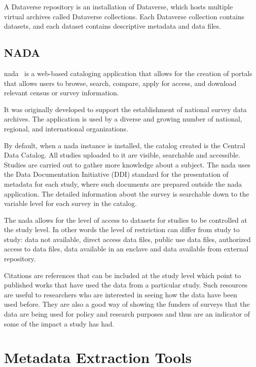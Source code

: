 A Dataverse repository is an installation of Dataverse, which hosts multiple virtual archives called Dataverse collections.
Each Dataverse collection contains datasets, and each dataset contains descriptive metadata and data files.


\subsection*{NADA}
\gls{nada}~\cite{nada} is a web-based cataloging application that allows for the creation of portals that allows users to browse, search, compare, apply for access, and download relevant census or survey information.

It was originally developed to support the establishment of national survey data archives.
The application is used by a diverse and growing number of national, regional, and international organizations.

By default, when a \gls{nada} instance is installed, the catalog created is the Central Data Catalog.
All studies uploaded to it are visible, searchable and accessible.
Studies are carried out to gather more knowledge about a subject.
The \gls{nada} uses the Data Documentation Initiative (DDI) standard for the presentation of metadata for each study, where such documents are prepared outside the \gls{nada} application.
The detailed information about the survey is searchable down to the variable level for each survey in the catalog.

The \gls{nada} allows for the level of access to datasets for studies to be controlled at the study level.
In other words the level of restriction can differ from study to study: data not available, direct access data files, public use data files, authorized access to data files, data available in an enclave and data available from external repository.

Citations are references that can be included at the study level which point to published works that have used the data from a particular study.
Such resources are useful to researchers who are interested in seeing how the data have been used before.
They are also a good way of showing the funders of surveys that the data are being used for policy and research purposes and thus are an indicator of some of the impact a study has had.

\section{Metadata Extraction Tools}

